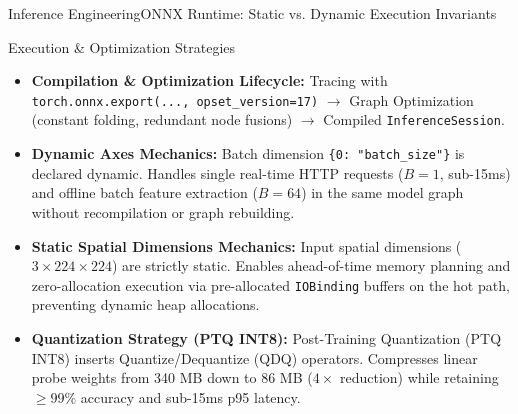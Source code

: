 \begin{frame}{Inference Engineering}{ONNX Runtime: Static vs. Dynamic Execution Invariants}
    \begin{block}{Execution \& Optimization Strategies}
        \begin{itemize}\footnotesize
            \item \textbf{Compilation \& Optimization Lifecycle:} Tracing with \texttt{torch.onnx.export(..., opset\_version=17)} $\to$ Graph Optimization (constant folding, redundant node fusions) $\to$ Compiled \texttt{InferenceSession}.
            \item \textbf{Dynamic Axes Mechanics:} Batch dimension \texttt{\{0: "batch\_size"\}} is declared dynamic. Handles single real-time HTTP requests ($B=1$, sub-15ms) and offline batch feature extraction ($B=64$) in the same model graph without recompilation or graph rebuilding.
            \item \textbf{Static Spatial Dimensions Mechanics:} Input spatial dimensions ($3 \times 224 \times 224$) are strictly static. Enables ahead-of-time memory planning and zero-allocation execution via pre-allocated \texttt{IOBinding} buffers on the hot path, preventing dynamic heap allocations.
            \item \textbf{Quantization Strategy (PTQ INT8):} Post-Training Quantization (PTQ INT8) inserts Quantize/Dequantize (QDQ) operators. Compresses linear probe weights from 340 MB down to 86 MB ($4\times$ reduction) while retaining $\ge 99\%$ accuracy and sub-15ms p95 latency.
        \end{itemize}
    \end{block}

    \vspace{0.15cm}
    \statusdone

\end{frame}


